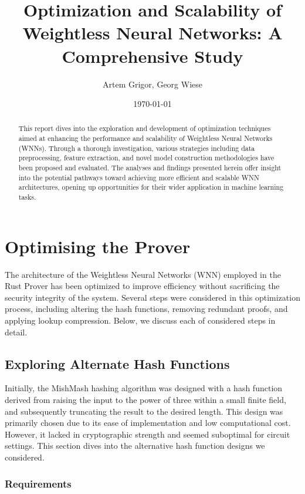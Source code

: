 \documentclass{article}[12pt]
\title{Optimization and Scalability of Weightless Neural Networks: A Comprehensive Study}
\author{Artem Grigor, Georg Wiese}
\date{\today}
\begin{document}
\maketitle

\begin{abstract}
This report dives into the exploration and development of optimization techniques aimed at enhancing the performance and scalability of Weightless Neural Networks (WNNs).
Through a thorough investigation, various strategies including data preprocessing, feature extraction, and novel model construction methodologies have been proposed and evaluated.
The analyses and findings presented herein offer insight into the potential pathways toward achieving more efficient and scalable WNN architectures, opening up opportunities for their wider application in machine learning tasks.
\end{abstract}

\newpage
\tableofcontents
\newpage


\newpage
\section{Optimising the Prover}\label{sec:optimising-architecture}

The architecture of the Weightless Neural Networks (WNN) employed in the Rust Prover has been optimized to improve efficiency without sacrificing the security integrity of the system.
Several steps were considered in this optimization process, including altering the hash functions, removing redundant proofs, and applying lookup compression.
Below, we discuss each of considered steps in detail.

\newpage
\subsection{Exploring Alternate Hash Functions}\label{subsec:exploring-alternate-hash-functions}

Initially, the MishMash hashing algorithm was designed with a hash function derived from raising the input to the power of three within a small finite field, and subsequently truncating the result to the desired length.
This design was primarily chosen due to its ease of implementation and low computational cost.
However, it lacked in cryptographic strength and seemed suboptimal for circuit settings.
This section dives into the alternative hash function designs we considered.


\subsubsection{Requirements}\label{subsubsec:requirements}
\end{document}
